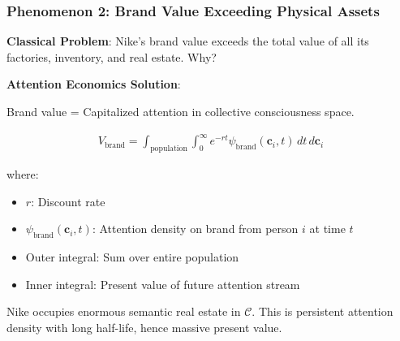 \documentclass[11pt,a4paper]{article}
\theoremstyle{definition}
\theoremstyle{remark}
\newcommand{\CC}{\mathcal{C}}
\newcommand{\cc}{\mathbf{c}}
\begin{document}
\begin{small}
\subsubsection{Phenomenon 2: Brand Value Exceeding Physical Assets}

\textbf{Classical Problem}: Nike's brand value exceeds the total value of all its factories, inventory, and real estate. Why?

\textbf{Attention Economics Solution}:

Brand value = Capitalized attention in collective consciousness space.

\begin{align}
V_{\text{brand}} = \int_{\text{population}} \int_0^\infty e^{-rt} \psi_{\text{brand}}(\cc_i, t) \, dt \, d\cc_i
\end{align}

where:
\begin{itemize}
    \item \(r\): Discount rate
    \item \(\psi_{\text{brand}}(\cc_i, t)\): Attention density on brand from person \(i\) at time \(t\)
    \item Outer integral: Sum over entire population
    \item Inner integral: Present value of future attention stream
\end{itemize}

Nike occupies enormous semantic real estate in \(\CC\). This is persistent attention density with long half-life, hence massive present value.

\begin{figure}[H]
\centering
{}
\end{figure}
\end{small}
\end{document}

